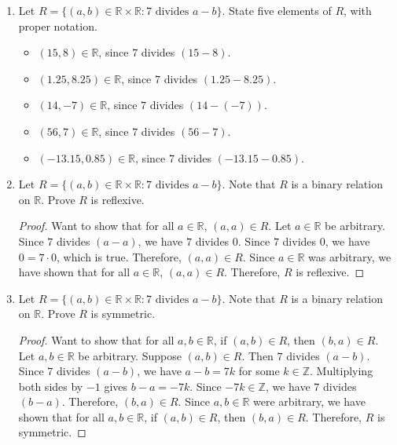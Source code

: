 \documentclass{article}
\newcommand\Z{\mathbb{Z}}
\newcommand\R{\mathbb{R}}
\begin{document}
\begin{enumerate}

\item Let $R = \{(a,b) \in \mathbb{R} \times \mathbb{R} : 7 \text{ divides } a-b\}$. State five elements of $R$, with proper notation.

\begin{itemize}

    \item $(15, 8) \in \R$, since $7$ divides $(15-8)$.
    \item $(1.25, 8.25) \in \R$, since $7$ divides $(1.25-8.25)$.
    \item $(14, -7) \in \R$, since $7$ divides $(14-(-7))$.
    \item $(56, 7) \in \R$, since $7$ divides $(56-7)$.
    \item $(-13.15, 0.85) \in \R$, since $7$ divides $(-13.15-0.85)$.

\end{itemize}

\newpage

\item Let $R = \{(a,b) \in \mathbb{R} \times \mathbb{R} : 7 \text{ divides } a-b\}$. Note that $R$ is a binary relation on $\mathbb{R}$. Prove $R$ is reflexive.

\begin{proof}
    Want to show that for all $a \in \R$, $(a,a) \in R$. Let $a \in \R$ be arbitrary. Since $7$ divides $(a-a)$, we have $7$ divides $0$. Since $7$ divides $0$, we have $0 = 7 \cdot 0$, which is true. Therefore, $(a,a) \in R$. Since $a \in \R$ was arbitrary, we have shown that for all $a \in \R$, $(a,a) \in R$. Therefore, $R$ is reflexive.
\end{proof}

\newpage

\item Let $R = \{(a,b) \in \mathbb{R} \times \mathbb{R} : 7 \text{ divides } a-b\}$. Note that $R$ is a binary relation on $\mathbb{R}$. Prove $R$ is symmetric.

\begin{proof}
    Want to show that for all $a,b \in \R$, if $(a,b) \in R$, then $(b,a) \in R$. Let $a,b \in \R$ be arbitrary. Suppose $(a,b) \in R$. Then $7$ divides $(a-b)$. Since $7$ divides $(a-b)$, we have $a-b = 7k$ for some $k \in \Z$. Multiplying both sides by $-1$ gives $b-a = -7k$. Since $-7k \in \Z$, we have $7$ divides $(b-a)$. Therefore, $(b,a) \in R$. Since $a,b \in \R$ were arbitrary, we have shown that for all $a,b \in \R$, if $(a,b) \in R$, then $(b,a) \in R$. Therefore, $R$ is symmetric.
\end{proof}


\end{enumerate}
\end{document}
